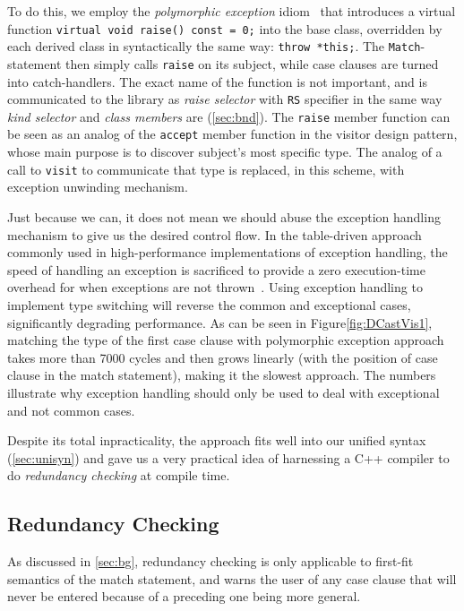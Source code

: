\documentclass[preprint]{sigplanconf}
\makeatletter
\DeclareRobustCommand{\code}[1]{{\lstinline[breaklines=false,escapechar=@]{#1}}}
\makeatother
\begin{document}
To do this, we employ the \emph{polymorphic exception} idiom~\cite{PolyExcept} that 
introduces a virtual function \code{virtual void raise() const = 0;} into the 
base class, overridden by each derived class in syntactically the same way: 
\code{throw *this;}. The \code{Match}-statement then simply calls \code{raise} on its subject, 
while case clauses are turned into catch-handlers.
The exact name of the function is not important, and is communicated to the 
library as \emph{raise selector} with \code{RS} specifier in the same way 
\emph{kind selector} and \emph{class members} are (\textsection\ref{sec:bnd}). 
The \code{raise} member function can be seen as an analog of the \code{accept} 
member function in the visitor design pattern, whose main purpose is to discover 
subject's most specific type. The analog of a call to \code{visit} to communicate 
that type is replaced, in this scheme, with exception unwinding mechanism.

Just because we can, it does not mean we should abuse the exception handling 
mechanism to give us the desired control flow. In the table-driven approach 
commonly used in high-performance implementations of exception handling, the 
speed of handling an exception is sacrificed to provide a zero execution-time 
overhead for when exceptions are not thrown~\cite{Schilling98}. Using exception 
handling to implement type switching will reverse the common and exceptional 
cases, significantly degrading performance. As can be seen in 
Figure\ref{fig:DCastVis1}, matching the type of the first case clause with 
polymorphic exception approach takes more than 7000 cycles and then grows 
linearly (with the position of case clause in the match statement), making it the 
slowest approach. The numbers illustrate why exception handling should only be 
used to deal with exceptional and not common cases.

Despite its total inpracticality, the approach fits well into our unified syntax 
(\textsection\ref{sec:unisyn}) and gave us a very practical idea of harnessing a
C++ compiler to do \emph{redundancy checking} at compile time.

\subsection{Redundancy Checking}
\label{sec:redun}

As discussed in \textsection\ref{sec:bg}, redundancy checking is only applicable 
to first-fit semantics of the match statement, and warns the user of any 
case clause that will never be entered because of a preceding one being more 
general.
\end{document}
